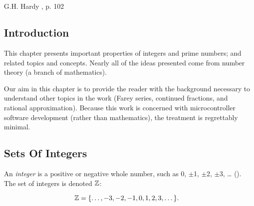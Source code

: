 \chapter[\cprizeroshorttitle{}]{\cprizerolongtitle{}}

\label{cpri0}

                     {G.H. Hardy \cite{bibref:b:mathematiciansapology:1940}, p. 102}

\section{Introduction}
\label{cpri0:int0}

This chapter presents important properties of integers and prime numbers; and
related topics and concepts.  Nearly all of the ideas presented come from
number theory (a branch of mathematics).

Our aim in this chapter is to provide the reader
with the background necessary to understand other 
topics in the work (Farey series,
continued fractions, and rational approximation).
Because this work is concerned with microcontroller
software development (rather than  mathematics),
the treatment is regrettably minimal.


\section{Sets Of Integers}
\label{cpri0:soi0}

An
\emph{integer} is a positive or negative whole number, such as 0,
$\pm$1, $\pm$2, $\pm$3, \ldots{} (\cite{bibref:b:penguindictionaryofmathematics:2ded}).
The set of integers is denoted ${\mathbb{Z}}$:%

\begin{equation}
{\mathbb{Z}} = \{ \ldots{} , -3, -2, -1, 0, 1, 2, 3, \ldots{} \}.
\end{equation}

